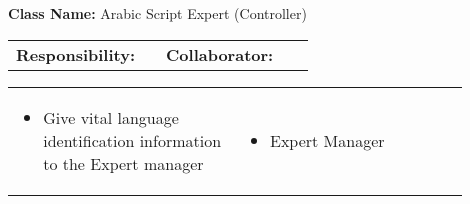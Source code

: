 \begin{cards}[]
    \textbf{Class Name:} Arabic Script Expert (Controller)
    \tcbline
    \begin{tabular}{p{0.45\linewidth} | p{0.45\linewidth}}
        \textbf{Responsibility:}& 
        \textbf{Collaborator:}\\
    \end{tabular}
    \tcbline
    \begin{tabular}{p{0.45\linewidth} | p{0.45\linewidth}}
        \begin{itemize}
            \item Give vital language identification information to the Expert manager
        \end{itemize}
        &
        \begin{itemize}
            \item Expert Manager
        \end{itemize}
    \end{tabular}
\end{cards}